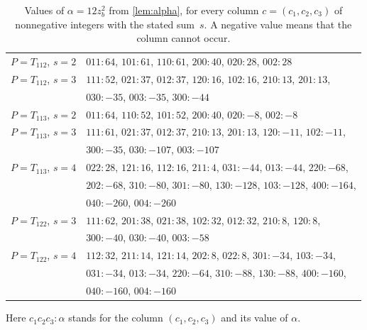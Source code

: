 \documentclass[11pt,a4paper]{amsart}
\theoremstyle{definition}
\theoremstyle{remark}
\begin{document}
\begin{table}[H]
\caption{Values of $\alpha=12z_b^2$ from \cref{lem:alpha}, for every column $c=(c_1,c_2,c_3)$ of nonnegative
integers with the stated sum~$s$. A negative value means that the column cannot occur.}
\label{tab:alpha}
\vspace{4pt}
\small
\begin{tabular}{@{}l@{\quad}l@{}}
\toprule
$P=T_{112}$, $s=2$ & $011\!:64$, $101\!:61$, $110\!:61$, $200\!:40$, $020\!:28$, $002\!:28$\\
$P=T_{112}$, $s=3$ & $111\!:52$, $021\!:37$, $012\!:37$, $120\!:16$, $102\!:16$, $210\!:13$, $201\!:13$,\\
 & $030\!:-35$, $003\!:-35$, $300\!:-44$\\
\midrule
$P=T_{113}$, $s=2$ & $011\!:64$, $110\!:52$, $101\!:52$, $200\!:40$, $020\!:-8$, $002\!:-8$\\
$P=T_{113}$, $s=3$ & $111\!:61$, $021\!:37$, $012\!:37$, $210\!:13$, $201\!:13$, $120\!:-11$, $102\!:-11$,\\
 & $300\!:-35$, $030\!:-107$, $003\!:-107$\\
$P=T_{113}$, $s=4$ & $022\!:28$, $121\!:16$, $112\!:16$, $211\!:4$, $031\!:-44$, $013\!:-44$, $220\!:-68$,\\
 & $202\!:-68$, $310\!:-80$, $301\!:-80$, $130\!:-128$, $103\!:-128$, $400\!:-164$,\\
 & $040\!:-260$, $004\!:-260$\\
\midrule
$P=T_{122}$, $s=3$ & $111\!:62$, $201\!:38$, $021\!:38$, $102\!:32$, $012\!:32$, $210\!:8$, $120\!:8$,\\
 & $300\!:-40$, $030\!:-40$, $003\!:-58$\\
$P=T_{122}$, $s=4$ & $112\!:32$, $211\!:14$, $121\!:14$, $202\!:8$, $022\!:8$, $301\!:-34$, $103\!:-34$,\\
 & $031\!:-34$, $013\!:-34$, $220\!:-64$, $310\!:-88$, $130\!:-88$, $400\!:-160$,\\
 & $040\!:-160$, $004\!:-160$\\
\bottomrule
\end{tabular}
\par\medskip
Here $c_1c_2c_3\!:\alpha$ stands for the column $(c_1,c_2,c_3)$ and its value of $\alpha$.
\end{table}
\end{document}
